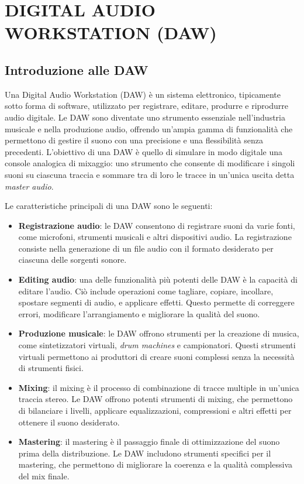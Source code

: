 \documentclass{book}
\begin{document}
\newpage

\chapter{DIGITAL AUDIO WORKSTATION (DAW)}

\section{Introduzione alle DAW}

Una Digital Audio Workstation (DAW) è un sistema elettronico, tipicamente sotto forma di software, utilizzato per registrare, editare, produrre e riprodurre audio digitale. Le DAW sono diventate uno strumento essenziale nell’industria musicale e nella produzione audio, offrendo un’ampia gamma di funzionalità che permettono di gestire il suono con una precisione e una flessibilità senza precedenti. L’obiettivo di una DAW è quello di simulare in modo digitale una console analogica di mixaggio: uno strumento che consente di modificare i singoli suoni su ciascuna traccia e sommare tra di loro le tracce in un’unica uscita detta \emph{master audio}.

Le caratteristiche principali di una DAW sono le seguenti:

\begin{itemize}
\item \textbf{Registrazione audio}: le DAW consentono di registrare suoni da varie fonti, come microfoni, strumenti musicali e altri dispositivi audio. La registrazione consiste nella generazione di un file audio con il formato desiderato per ciascuna delle sorgenti sonore.
\item \textbf{Editing audio}: una delle funzionalità più potenti delle DAW è la capacità di editare l’audio. Ciò include operazioni come tagliare, copiare, incollare, spostare segmenti di audio, e applicare effetti. Questo permette di correggere errori, modificare l’arrangiamento e migliorare la qualità del suono.
\item \textbf{Produzione musicale}: le DAW offrono strumenti per la creazione di musica, come sintetizzatori virtuali, \emph{drum machines} e campionatori. Questi strumenti virtuali permettono ai produttori di creare suoni complessi senza la necessità di strumenti fisici.
\item \textbf{Mixing}: il mixing è il processo di combinazione di tracce multiple in un’unica traccia stereo. Le DAW offrono potenti strumenti di mixing, che permettono di bilanciare i livelli, applicare equalizzazioni, compressioni e altri effetti per ottenere il suono desiderato.
\item \textbf{Mastering}: il mastering è il passaggio finale di ottimizzazione del suono prima della distribuzione. Le DAW includono strumenti specifici per il mastering, che permettono di migliorare la coerenza e la qualità complessiva del mix finale.
\end{itemize}
\end{document}
